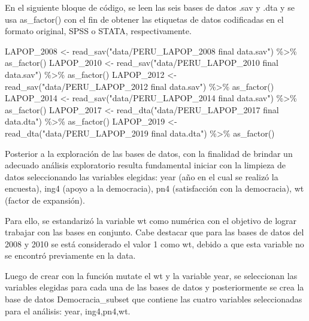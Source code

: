 \documentclass[
]{book}
\newenvironment{Shaded}{\begin{snugshade}}{\end{snugshade}}
\newcommand{\FunctionTok}[1]{\textcolor[rgb]{0.00,0.00,0.00}{#1}}
\newcommand{\NormalTok}[1]{#1}
\newcommand{\OtherTok}[1]{\textcolor[rgb]{0.56,0.35,0.01}{#1}}
\newcommand{\SpecialCharTok}[1]{\textcolor[rgb]{0.00,0.00,0.00}{#1}}
\newcommand{\StringTok}[1]{\textcolor[rgb]{0.31,0.60,0.02}{#1}}
\begin{document}
En el siguiente bloque de código, se leen las seis bases de datos .sav y .dta y se usa as\_factor() con el fin de obtener las etiquetas de datos codificadas en el formato original, SPSS o STATA, respectivamente.

\begin{Shaded}
\begin{Highlighting}[]
\NormalTok{LAPOP\_2008 }\OtherTok{\textless{}{-}} \FunctionTok{read\_sav}\NormalTok{(}\StringTok{"data/PERU\_LAPOP\_2008 final data.sav"}\NormalTok{) }\SpecialCharTok{\%\textgreater{}\%} \FunctionTok{as\_factor}\NormalTok{()}
\NormalTok{LAPOP\_2010 }\OtherTok{\textless{}{-}} \FunctionTok{read\_sav}\NormalTok{(}\StringTok{"data/PERU\_LAPOP\_2010 final data.sav"}\NormalTok{) }\SpecialCharTok{\%\textgreater{}\%} \FunctionTok{as\_factor}\NormalTok{()}
\NormalTok{LAPOP\_2012 }\OtherTok{\textless{}{-}} \FunctionTok{read\_sav}\NormalTok{(}\StringTok{"data/PERU\_LAPOP\_2012 final data.sav"}\NormalTok{) }\SpecialCharTok{\%\textgreater{}\%} \FunctionTok{as\_factor}\NormalTok{()}
\NormalTok{LAPOP\_2014 }\OtherTok{\textless{}{-}} \FunctionTok{read\_sav}\NormalTok{(}\StringTok{"data/PERU\_LAPOP\_2014 final data.sav"}\NormalTok{) }\SpecialCharTok{\%\textgreater{}\%} \FunctionTok{as\_factor}\NormalTok{()}
\NormalTok{LAPOP\_2017 }\OtherTok{\textless{}{-}} \FunctionTok{read\_dta}\NormalTok{(}\StringTok{"data/PERU\_LAPOP\_2017 final data.dta"}\NormalTok{) }\SpecialCharTok{\%\textgreater{}\%} \FunctionTok{as\_factor}\NormalTok{()}
\NormalTok{LAPOP\_2019 }\OtherTok{\textless{}{-}} \FunctionTok{read\_dta}\NormalTok{(}\StringTok{"data/PERU\_LAPOP\_2019 final data.dta"}\NormalTok{) }\SpecialCharTok{\%\textgreater{}\%} \FunctionTok{as\_factor}\NormalTok{()}
\end{Highlighting}
\end{Shaded}

Posterior a la exploración de las bases de datos, con la finalidad de brindar un adecuado análisis exploratorio resulta fundamental iniciar con la limpieza de datos seleccionando las variables elegidas: year (año en el cual se realizó la encuesta), ing4 (apoyo a la democracia), pn4 (satisfacción con la democracia), wt (factor de expansión).

Para ello, se estandarizó la variable wt como numérica con el objetivo de lograr trabajar con las bases en conjunto. Cabe destacar que para las bases de datos del 2008 y 2010 se está considerado el valor 1 como wt, debido a que esta variable no se encontró previamente en la data.

Luego de crear con la función mutate el wt y la variable year, se seleccionan las variables elegidas para cada una de las bases de datos y posteriormente se crea la base de datos Democracia\_subset que contiene las cuatro variables seleccionadas para el análisis: year, ing4,pn4,wt.
\end{document}
